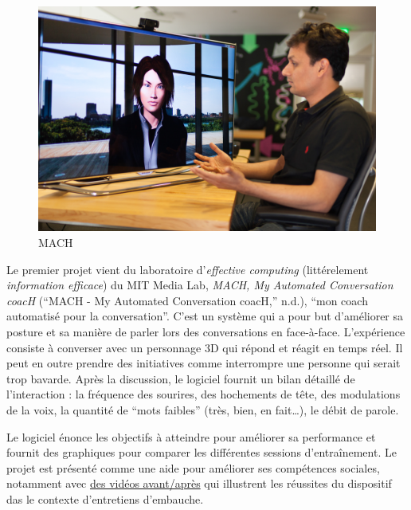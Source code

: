\documentclass[]{article}
\begin{document}
\begin{figure}
\centering
\includegraphics{./tex2pdf.9048/9c6b7392e4842223c2663a48fb2493b3904d4770.jpg}
\caption{MACH}
\end{figure}

Le premier projet vient du laboratoire d'\emph{effective computing}
(littérelement \emph{information efficace}) du MIT Media Lab,
\emph{MACH, My Automated Conversation coacH} (``MACH - My Automated
Conversation coacH,'' n.d.), ``mon coach automatisé pour la
conversation''. C'est un système qui a pour but d'améliorer sa posture
et sa manière de parler lors des conversations en face-à-face.
L'expérience consiste à converser avec un personnage 3D qui répond et
réagit en temps réel. Il peut en outre prendre des initiatives comme
interrompre une personne qui serait trop bavarde. Après la discussion,
le logiciel fournit un bilan détaillé de l'interaction : la fréquence
des sourires, des hochements de tête, des modulations de la voix, la
quantité de ``mots faibles'' (très, bien, en fait\ldots{}), le débit de
parole.

Le logiciel énonce les objectifs à atteindre pour améliorer sa
performance et fournit des graphiques pour comparer les différentes
sessions d'entraînement. Le projet est présenté comme une aide pour
améliorer ses compétences sociales, notamment avec
\href{https://www.youtube.com/watch?v=CHVNOiCT8vA}{des vidéos
avant/après} qui illustrent les réussites du dispositif das le contexte
d'entretiens d'embauche.
\end{document}
